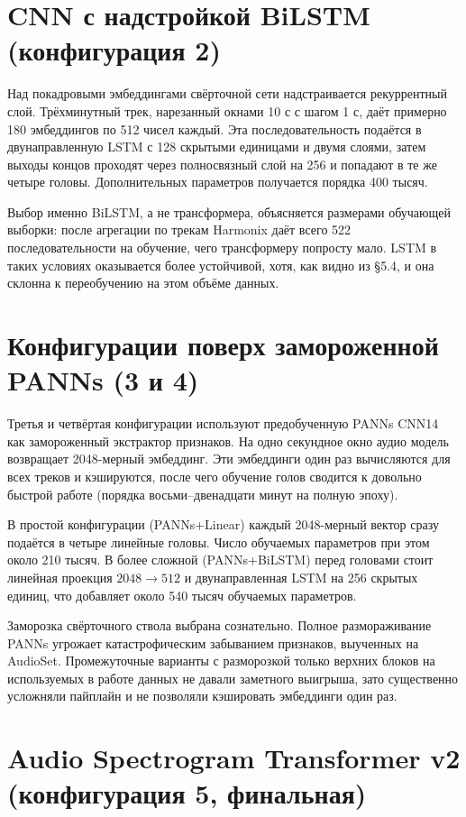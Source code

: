 \section{CNN с надстройкой BiLSTM (конфигурация 2)}\label{sec:4-3}

Над покадровыми эмбеддингами свёрточной сети надстраивается рекуррентный слой. Трёхминутный трек, нарезанный окнами 10 с с шагом 1 с, даёт примерно 180 эмбеддингов по 512 чисел каждый. Эта последовательность подаётся в двунаправленную LSTM с 128 скрытыми единицами и двумя слоями, затем выходы концов проходят через полносвязный слой на 256 и попадают в те же четыре головы. Дополнительных параметров получается порядка 400 тысяч.

Выбор именно BiLSTM, а не трансформера, объясняется размерами обучающей выборки: после агрегации по трекам Harmonix даёт всего 522 последовательности на обучение, чего трансформеру попросту мало. LSTM в таких условиях оказывается более устойчивой, хотя, как видно из §5.4, и она склонна к переобучению на этом объёме данных.

\section{Конфигурации поверх замороженной PANNs (3 и 4)}\label{sec:4-4}

Третья и четвёртая конфигурации используют предобученную PANNs CNN14~\cite{kong2020panns} как замороженный экстрактор признаков. На одно секундное окно аудио модель возвращает 2048-мерный эмбеддинг. Эти эмбеддинги один раз вычисляются для всех треков и кэшируются, после чего обучение голов сводится к довольно быстрой работе (порядка восьми--двенадцати минут на полную эпоху).

В простой конфигурации (PANNs+Linear) каждый 2048-мерный вектор сразу подаётся в четыре линейные головы. Число обучаемых параметров при этом около 210 тысяч. В более сложной (PANNs+BiLSTM) перед головами стоит линейная проекция $2048 \to 512$ и двунаправленная LSTM на 256 скрытых единиц, что добавляет около 540 тысяч обучаемых параметров.

Заморозка свёрточного ствола выбрана сознательно. Полное размораживание PANNs угрожает катастрофическим забыванием признаков, выученных на AudioSet. Промежуточные варианты с разморозкой только верхних блоков на используемых в работе данных не давали заметного выигрыша, зато существенно усложняли пайплайн и не позволяли кэшировать эмбеддинги один раз.

\section{Audio Spectrogram Transformer v2 (конфигурация 5, финальная)}\label{sec:4-5}

